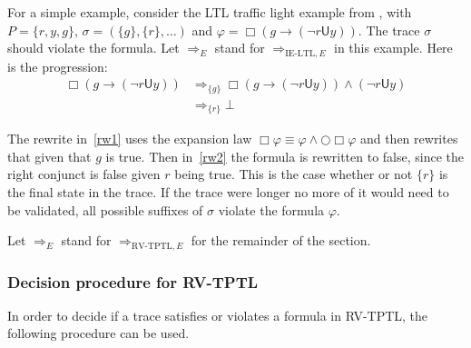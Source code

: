 \documentclass[a4paper]{article}
\newcommand{\U}{\mathsf{U}}
\newcommand{\rw}[1]{\Rightarrow_{#1}}
\begin{document}
\begin{eg}

  For a simple example, consider the LTL traffic light example from \textcite[175]{rosu2005rewriting}, with $P=\{r,y,g\}$, $\sigma = (\{g\},\{r\},\dots)$ and $\varphi = \Box (g \to (\neg r \U y))$. The trace $\sigma$ should violate the formula. Let $\rw{E}$ stand for $\rw{\text{IE-LTL},E}$ in this example. Here is the progression:
\begin{align}
  \Box (g \to (\neg r \U y)) &\rw{\{g\}} \Box (g \to (\neg r \U y)) \land (\neg r \U y)\label{rw1}\\
  &\rw{\{r\}} \bot\label{rw2}
\end{align}

The rewrite in~\eqref{rw1} uses the expansion law $\Box \varphi \equiv \varphi \land \bigcirc \Box \varphi$ and then rewrites that given that $g$ is true.
Then in~\eqref{rw2} the formula is rewritten to false, since the right conjunct is false given $r$ being true. This is the case whether or not $\{r\}$ is the final state in the trace. If the trace were longer no more of it would need to be validated, all possible suffixes of $\sigma$ violate the formula $\varphi$.
\end{eg}

Let $\rw{E}$ stand for $\rw{\text{RV-TPTL},E}$ for the remainder of the section.


\subsubsection{Decision procedure for RV-TPTL}
In order to decide if a trace satisfies or violates a formula in RV-TPTL, the following procedure can be used.
\end{document}
